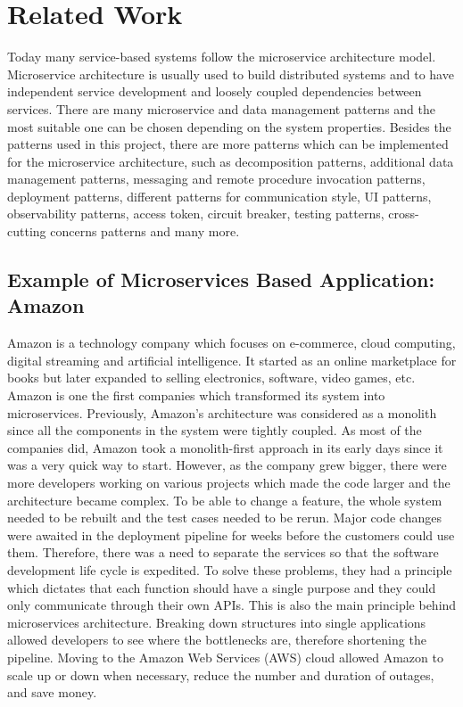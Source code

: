 \documentclass{article}
\begin{document}
\section{Related Work}

Today many service-based systems follow the microservice architecture model. Microservice architecture is usually used to build distributed systems and to have independent service development and loosely coupled dependencies between services. There are many microservice and data management patterns and the most suitable one can be chosen depending on the system properties\cite{uni}.
\bigbreak
\noindent Besides the patterns used in this project, there are more patterns which can be implemented for the microservice architecture, such as decomposition patterns, additional data management patterns, messaging and remote procedure invocation patterns, deployment patterns, different patterns for communication style, UI patterns, observability patterns, access token, circuit breaker, testing patterns, cross-cutting concerns patterns and many more\cite{io}. 

\subsection[Example of Microservices Based Application: Amazon]{Example of Microservices Based Application: \\ Amazon}

Amazon is a technology company which focuses on e-commerce, cloud computing, digital streaming and artificial intelligence. It started as an online marketplace for books but later expanded to selling electronics, software, video games, etc\cite{wiki}.
\bigbreak
\noindent Amazon is one the first companies which transformed its system into microservices. Previously, Amazon’s architecture was considered as a monolith since all the components in the system were tightly coupled. As most of the companies did, Amazon took a monolith-first approach in its early days since it was a very quick way to start. However, as the company grew bigger, there were more developers working on various projects which made the code larger and the architecture became complex.\cite{amazon1} To be able to change a feature, the whole system needed to be rebuilt and the test cases needed to be rerun. Major code changes were awaited in the deployment pipeline for weeks before the customers could use them.\cite{amazon2} Therefore, there was a need to separate the services so that the software development life cycle is expedited.  To solve these problems, they had a principle which dictates that each function should have a single purpose and they could only communicate through their own APIs. This is also the main principle behind microservices architecture. Breaking down structures into single applications allowed developers to see where the bottlenecks are, therefore shortening the pipeline. Moving to the Amazon Web Services (AWS) cloud allowed Amazon to scale up or down when necessary, reduce the number and duration of outages, and save money\cite{amazon3}.
\end{document}
